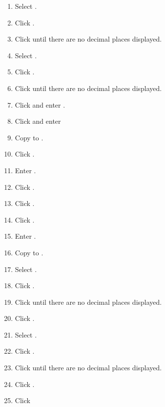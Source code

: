 \begin{enumbox}
\begin{enumerate}
		\item Select .
		\item Click .
		\item Click  until there are no decimal places displayed.
	
		\item Select .
		\item Click .
		\item Click  until there are no decimal places displayed.
	
		\item Click  and enter .
		\item Click  and enter 
		\item Copy  to .
	
		\item Click . 
		\item Enter . 
		\item Click .
		\item Click .
	
		\item Click .
		\item Enter .
		\item Copy  to .
	
		\item Select .
		\item Click .
		\item Click  until there are no decimal places displayed.
		\item Click .
		
		\item Select .
		\item Click .
		\item Click  until there are no decimal places displayed.
		\item Click .
		\item Click  
	

\end{enumerate}
\end{enumbox}
